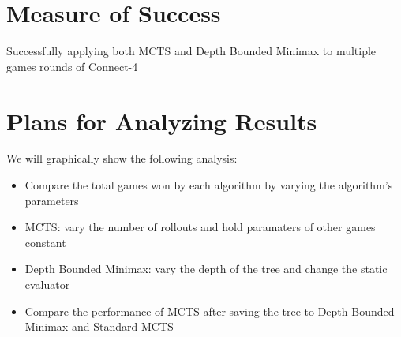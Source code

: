 \documentclass[11pt]{article}
\begin{document}
\section{Measure of Success}


Successfully applying both MCTS and Depth Bounded Minimax to 
multiple games rounds of Connect-4 

\section{Plans for Analyzing Results}

We will graphically show the following analysis: 
\begin{itemize}
\item Compare the total games won by each algorithm by varying the algorithm's parameters
\item MCTS: vary the number of rollouts and hold paramaters of other games constant
\item Depth Bounded Minimax: vary the depth of the tree and change the static evaluator
\item Compare the performance of MCTS after saving the tree to Depth Bounded Minimax and Standard MCTS
\end{itemize}
\end{document}
